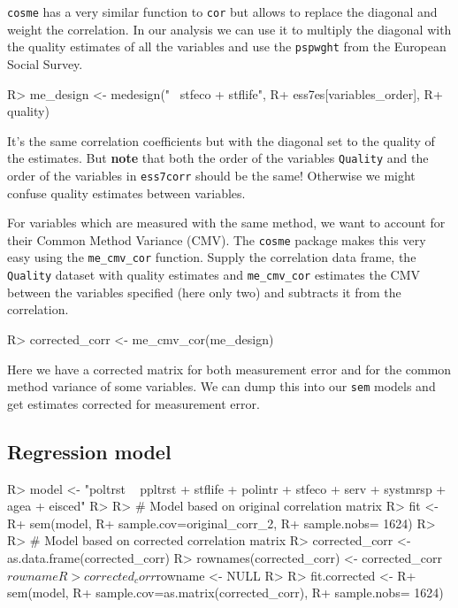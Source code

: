 \documentclass[
]{jss}
\begin{document}
\texttt{cosme} has a very similar function to \texttt{cor} but
allows to replace the diagonal and weight the correlation. In our
analysis we can use it to multiply the diagonal with the quality
estimates of all the variables and use the \texttt{pspwght} from the
European Social Survey.

\begin{CodeChunk}

\begin{CodeInput}
R> me_design <- medesign("~ stfeco + stflife",
R+                       ess7es[variables_order],
R+                       quality)
\end{CodeInput}
\end{CodeChunk}

It's the same correlation coefficients but with the diagonal set to the
quality of the estimates. But \textbf{note} that both the order of the
variables \texttt{Quality} and the order of the variables in
\texttt{ess7corr} should be the same! Otherwise we might confuse quality
estimates between variables.

For variables which are measured with the same method, we want to
account for their Common Method Variance (CMV). The
\texttt{cosme} package makes this very easy using the
\texttt{me\_cmv\_cor} function. Supply the correlation data frame, the
\texttt{Quality} dataset with quality estimates and
\texttt{me\_cmv\_cor} estimates the CMV between the variables specified
(here only two) and subtracts it from the correlation.

\begin{CodeChunk}

\begin{CodeInput}
R> corrected_corr <- me_cmv_cor(me_design)
\end{CodeInput}
\end{CodeChunk}

Here we have a corrected matrix for both measurement error and for the
common method variance of some variables. We can dump this into our
\texttt{sem} models and get estimates corrected for measurement error.

\hypertarget{regression-model}{%
\subsection{Regression model}\label{regression-model}}

\begin{CodeChunk}

\begin{CodeInput}
R> model <- "poltrst ~ ppltrst + stflife + polintr + stfeco + serv + systmrsp + agea + eisced"
R> 
R> # Model based on original correlation matrix
R> fit <-
R+   sem(model,
R+       sample.cov=original_corr_2,
R+       sample.nobs= 1624)
R> 
R> # Model based on corrected correlation matrix
R> corrected_corr <- as.data.frame(corrected_corr)
R> rownames(corrected_corr) <- corrected_corr$rowname
R> corrected_corr$rowname <- NULL
R> 
R> fit.corrected <-
R+   sem(model,
R+       sample.cov=as.matrix(corrected_corr),
R+       sample.nobs= 1624)
\end{CodeInput}
\end{CodeChunk}
\end{document}
